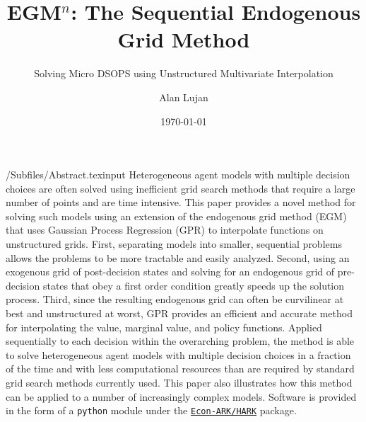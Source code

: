\documentclass[SequentialEGM]{subfiles}
\begin{document}

\title{EGM$^n$: The Sequential Endogenous Grid Method}
\subtitle{Solving Micro DSOPS using Unstructured Multivariate Interpolation}

\author{Alan Lujan\authNum}



\date{\today}

\maketitle

\hypertarget{abstract}{}
\begin{verbatimwrite}{\econtexRoot/Subfiles/Abstract.texinput}
  Heterogeneous agent models with multiple decision choices are often solved using inefficient grid search methods that require a large number of points and are time intensive.
  This paper provides a novel method for solving such models using an extension of the endogenous grid method (EGM) that uses Gaussian Process Regression (GPR) to interpolate functions on unstructured grids.
  First, separating models into smaller, sequential problems allows the problems to be more tractable and easily analyzed.
  Second, using an exogenous grid of post-decision states and solving for an endogenous grid of pre-decision states that obey a first order condition greatly speeds up the solution process.
  Third, since the resulting endogenous grid can often be curvilinear at best and unstructured at worst, GPR provides an efficient and accurate method for interpolating the value, marginal value, and policy functions.
  Applied sequentially to each decision within the overarching problem, the method is able to solve heterogeneous agent models with multiple decision choices in a fraction of the time and with less computational resources than are required by standard grid search methods currently used.
  This paper also illustrates how this method can be applied to a number of increasingly complex models. Software is provided in the form of a \texttt{python} module under the \href{https://econ-ark/HARK}{\texttt{Econ-ARK/HARK}} package.
\end{verbatimwrite}

\end{document}
